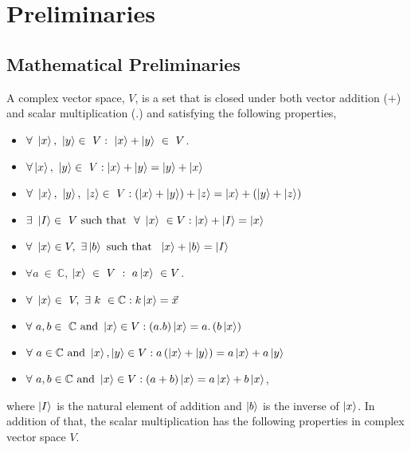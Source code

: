 \chapter{Preliminaries}
\section{ Mathematical Preliminaries }
\begin{defn}


A complex vector space, $V$, is a set that is closed under both vector addition
($ +$) and scalar multiplication (.) and satisfying the following properties,
\begin{itemize}
\item $\forall~ \ket{x},~\ket{y} \in ~ V : ~\ket{x}+\ket{y} ~\in~ V $.
\item $\forall \ket{x},~\ket{y} \in ~ V : \ket{x}+\ket{y}=\ket{y}+\ket{x}$
\item $\forall~ \ket{x},~\ket{y}, ~\ket{z} \in ~ V:\left(\ket{x}+\ket{y}\right)+\ket{z}=\ket{x}+\left(\ket{y}+\ket{z}\right)$
\item $\exists ~\ket{I} \in ~V~ \text{such that }~ \forall~ \ket{x} ~\in V: \ket{x}+\ket{I}=\ket{x}$
\item $\forall ~\ket{x} \in V,~ \exists \ket{b} ~ \text{such that } ~\ket{x}+\ket{b}= \ket{I}$
\item $\forall a~\in ~\mathbb{C}$, $\ket{x}~\in ~V~ :~ a\ket{x}~ \in V$.
\item $\forall ~\ket{x} \in ~V,~ \exists~ k ~\in \mathbb{C} :k\ket{x}=\vec{x}$
\item $\forall ~ a,b \in ~\mathbb{C} ~\text{and} ~ \ket{x}\in V :\left(a.b\right) \ket{x}=a.\left(b \ket{x}\right)$
\item $\forall ~ a \in \mathbb{C} ~\text{and} ~ \ket{x}, \ket{y}\in V:a\left(\ket{x}+\ket{y}\right)=a\ket{x}+a\ket{y}$
\item $\forall ~ a,b \in \mathbb{C} ~\text{and} ~ \ket{x}\in V:\left(a+b\right)\ket{x}=a\ket{x}+b\ket{x}$,
\end{itemize}
\end{defn}
where $\ket{I}$ is the natural element of addition and $\ket{b}$ is the inverse of $\ket{x}$.
In addition of that, the scalar multiplication has the following properties in complex vector space $V$.
